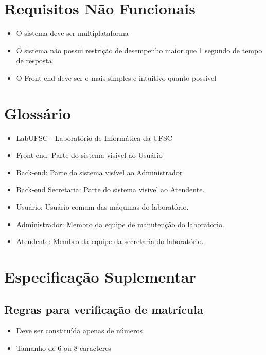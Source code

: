 \documentclass[brazil]{abnt}
\begin{document}
\chapter{Requisitos Não Funcionais}
\begin{itemize}
  \item O sistema deve ser multiplataforma
  \item O sistema não possui restrição de desempenho maior que 1 segundo de
  tempo de resposta
  \item O Front-end deve ser o mais simples e intuitivo quanto possível
\end{itemize}

\chapter{Glossário}
\begin{itemize}
  \item LabUFSC - Laboratório de Informática da UFSC
  \item Front-end: Parte do sistema visível ao Usuário
  \item Back-end: Parte do sistema visível ao Administrador
  \item Back-end Secretaria: Parte do sistema visível ao Atendente.
  \item Usuário: Usuário comum das máquinas do laboratório.
  \item Administrador: Membro da equipe de manutenção do laboratório.
  \item Atendente: Membro da equipe da secretaria do laboratório.
\end{itemize}

\chapter{Especificação Suplementar}
\section{Regras para verificação de matrícula}
\begin{itemize}
  \item Deve ser constituída apenas de números
  \item Tamanho de 6 ou 8 caracteres
\end{itemize}

%
%
\end{document}
